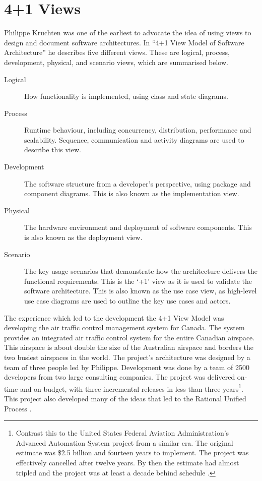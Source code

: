 \section{4+1 Views}
Philippe Kruchten was one of the earliest to advocate the idea of using views to design and document software architectures.
In ``4+1 View Model of Software Architecture'' \cite{4+1-model} he describes five different views.
These are logical, process, development, physical, and scenario views, which are summarised below.
\begin{description}
    \item[Logical] How functionality is implemented, using class and state diagrams.
    \item[Process] Runtime behaviour, including concurrency, distribution, performance and scalability.
                            Sequence, communication and activity diagrams are used to describe this view.
    \item[Development] The software structure from a developer's perspective, using package and component diagrams.
                                    This is also known as the implementation view.
    \item[Physical] The hardware environment and deployment of software components.
                            This is also known as the deployment view.
    \item[Scenario] The key usage scenarios that demonstrate how the architecture delivers the functional requirements.
                             This is the `+1' view as it is used to validate the software architecture.
                             This is also known as the use case view, as high-level use case diagrams are used to outline the key use cases and actors.
\end{description}
The experience which led to the development the 4+1 View Model was developing the air traffic control management system for Canada.
The system provides an integrated air traffic control system for the entire Canadian airspace.
This airspace is about double the size of the Australian airspace and borders the two busiest airspaces in the world.
The project's architecture was designed by a team of three people led by Philippe.
Development was done by a team of 2500 developers from two large consulting companies.
The project was delivered on-time and on-budget, with three incremental releases in less than three years\footnote{Contrast
this to the United States Federal Aviation Administration's Advanced Automation System project from a similar era.
The original estimate was \$2.5 billion and fourteen years to implement.
The project was effectively cancelled after twelve years.
By then the estimate had almost tripled and the project was at least a decade behind schedule \cite{faa-aas}.}.
This project also developed many of the ideas that led to the Rational Unified Process \cite{kruchten2004rational}.

